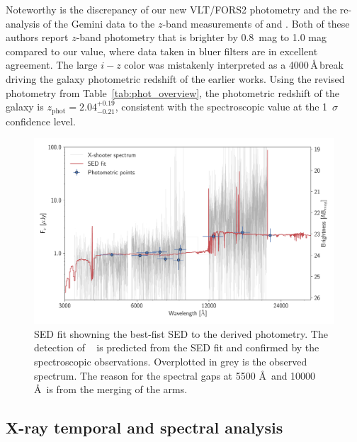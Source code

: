 \documentclass{aa}    %
\begin{document}
Noteworthy is the discrepancy of our new VLT/FORS2 photometry and the
re-analysis of the Gemini data to the $z$-band measurements of
\citet{Margutti2012} and \citet{Sakamoto2013}. Both of these authors report
$z$-band photometry that is brighter by 0.8~mag to 1.0 mag compared to our
value, where data taken in bluer filters are in excellent agreement. The large
$i-z$ color was mistakenly interpreted as a 4000\,\AA\,break driving the galaxy
photometric redshift of the earlier works. Using the revised photometry from
Table~\ref{tab:phot_overview}, the photometric redshift of the galaxy is
$z_{\mathrm{phot}}=2.04_{-0.21}^{+0.19}$, consistent with the spectroscopic
value at the 1~$\sigma$ confidence level.

 \begin{figure}
	\centering
	\includegraphics[width=16cm]{figures/SEDspecphot.pdf}
	\caption{SED fit showning the best-fist SED to the derived photometry. The detection of \lya~ is predicted from the SED fit and confirmed by the spectroscopic observations. Overplotted in grey is the observed spectrum. The reason for the spectral gaps at 5500 \AA~and 10000 \AA~is from the merging of the arms.}
	\label{fig:SED}
\end{figure}

\subsection{X-ray temporal and spectral analysis}
\end{document}
